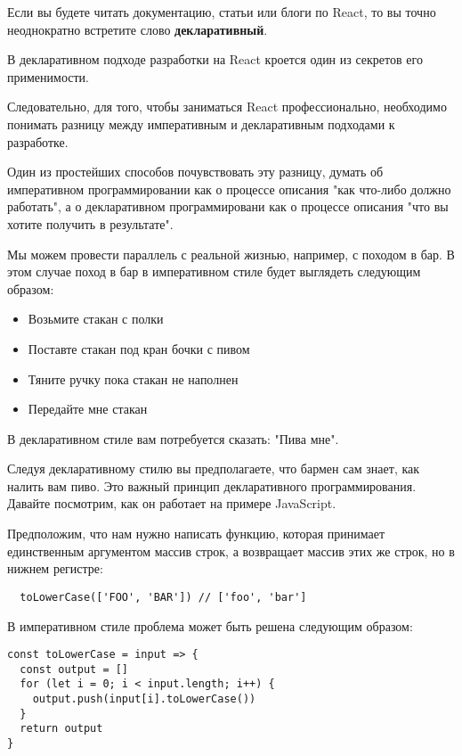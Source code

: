 Если вы будете читать документацию, статьи или блоги по React, то вы точно неоднократно встретите слово \textbf{декларативный}.

В декларативном подходе разработки на React кроется один из секретов его применимости.

Следовательно, для того, чтобы заниматься React профессионально, необходимо понимать разницу между императивным и декларативным подходами к разработке.

Один из простейших способов почувствовать эту разницу, думать об императивном программировании как о процессе описания "как что-либо должно работать", а о декларативном программировани как о процессе описания "что вы хотите получить в результате".

Мы можем провести параллель с реальной жизнью, например, с походом в бар. В этом случае поход в бар в императивном стиле будет выглядеть следующим образом:

\begin{itemize}
  \item Возьмите стакан с полки
  \item Поставте стакан под кран бочки с пивом
  \item Тяните ручку пока стакан не наполнен
  \item Передайте мне стакан
\end{itemize}

В декларативном стиле вам потребуется сказать: "Пива мне".

Следуя декларативному стилю вы предполагаете, что бармен сам знает, как налить вам пиво. Это важный принцип декларативного программирования. Давайте посмотрим, как он работает на примере JavaScript.

Предположим, что нам нужно написать функцию, которая принимает единственным аргументом массив строк, а возвращает массив этих же строк, но в нижнем регистре:

\begin{lstlisting}
  toLowerCase(['FOO', 'BAR']) // ['foo', 'bar']
\end{lstlisting}

В императивном стиле проблема может быть решена следующим образом:

\begin{lstlisting}
const toLowerCase = input => {
  const output = []
  for (let i = 0; i < input.length; i++) {
    output.push(input[i].toLowerCase())
  }
  return output
}
\end{lstlisting}

